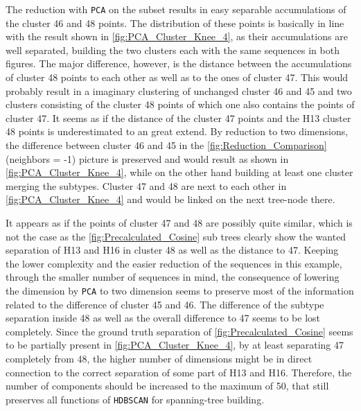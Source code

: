 \vspace{1em}

The reduction with \texttt{PCA} on the subset results in easy separable accumulations of the cluster 46 and 48 points. The distribution of these points is basically in line with the result shown in \autoref{fig:PCA_Cluster_Knee_4}, as their accumulations are well separated, building the two clusters each with the same sequences in both figures. The major difference, however, is the distance between the accumulations of cluster 48 points to each other as well as to the ones of cluster 47. This would probably result in a imaginary clustering of unchanged cluster 46 and 45 and two clusters consisting of the cluster 48 points of which one also contains the points of cluster 47. It seems as if the distance of the cluster 47 points and the H13 cluster 48 points is underestimated to an great extend. By reduction to two dimensions, the difference between cluster 46 and 45 in the \autoref{fig:Reduction_Comparison} (neighbors = -1) picture is preserved and would result as shown in \autoref{fig:PCA_Cluster_Knee_4}, while on the other hand building at least one cluster merging the subtypes. Cluster 47 and 48 are next to each other in \autoref{fig:PCA_Cluster_Knee_4} and would be linked on the next tree-node there.

\vspace{1em}

It appears as if the points of cluster 47 and 48 are possibly quite similar, which is not the case as the \autoref{fig:Precalculated_Cosine} sub trees clearly show the wanted separation of H13 and H16 in cluster 48 as well as the distance to 47. Keeping the lower complexity and the easier reduction of the sequences in this example, through the smaller number of sequences in mind, the consequence of lowering the dimension by \texttt{PCA} to two dimension seems to preserve most of the information related to the difference of cluster 45 and 46. The difference of the subtype separation inside 48 as well as the overall difference to 47 seems to be lost completely. Since the ground truth separation of \autoref{fig:Precalculated_Cosine} seems to be partially present in \autoref{fig:PCA_Cluster_Knee_4}, by at least separating 47 completely from 48, the higher number of dimensions might be in direct connection to the correct separation of some part of H13 and H16. Therefore, the number of components should be increased to the maximum of 50, that still preserves all functions of \texttt{HDBSCAN} for spanning-tree building. 

